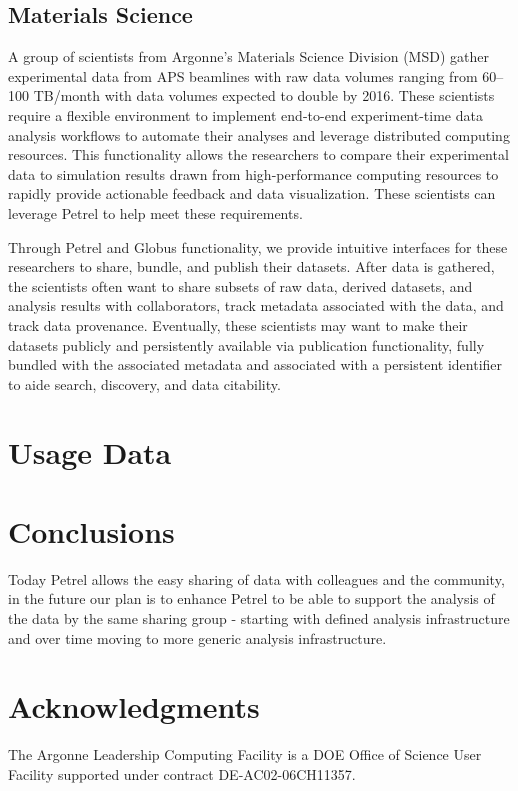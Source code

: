 \documentclass[sigconf]{acmart}
\begin{document}
\subsection{Materials Science}

A group of scientists from Argonne's Materials Science Division (MSD) gather experimental data from APS beamlines with raw data volumes ranging from 60--100 TB/month with data volumes expected to double by 2016. These scientists require a flexible environment to implement end-to-end experiment-time data analysis workflows to automate their analyses and leverage distributed computing resources. This functionality allows the researchers to compare their experimental data to simulation results drawn from high-performance computing resources to rapidly provide actionable feedback and data visualization. These scientists can leverage Petrel to help meet these requirements.

Through Petrel and Globus functionality, we provide intuitive interfaces for these researchers to share, bundle, and publish their datasets. After data is gathered, the scientists often want to share subsets of raw data, derived datasets, and analysis results with collaborators, track metadata associated with the data, and track data provenance. Eventually, these scientists may want to make their datasets publicly and persistently available via publication functionality, fully bundled with the associated metadata and associated with a persistent identifier to aide search, discovery, and data citability.

\section{Usage Data}






\section{Conclusions}
Today Petrel allows the easy sharing of data with colleagues and the community, in the future our plan is to enhance Petrel to be able to support the analysis of the data by the same sharing group - starting with defined analysis infrastructure and over time moving to more generic analysis infrastructure.

\section*{Acknowledgments}
The Argonne Leadership Computing Facility is a DOE Office of Science User Facility supported under contract DE-AC02-06CH11357.



 
\end{document}
